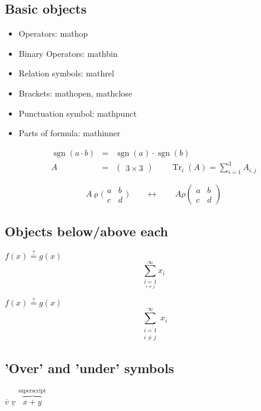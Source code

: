 \documentclass[a4paper]{article}
\begin{document}
    \subsection{Basic objects}
    \begin{itemize}
        \item Operators: mathop
        \item Binary Operators: mathbin
        \item Relation symbols: mathrel
        \item Brackets: mathopen, mathclose
        \item Punctuation symbol: mathpunct
        \item Parts of formula: mathinner
    \end{itemize}

    \newcommand{\sgn}{\mathop{\mathrm{sgn}}\nolimits}
    \newcommand{\trace}{\mathop{\mathrm{Tr}}}

    \begin{eqnarray}
        \sgn(a\cdot b) &=& \sgn(a)\cdot \sgn(b)\\
        A&=&\begin{pmatrix}
            3\times 3
        \end{pmatrix}\qquad\trace_i(A)=\sum_{i=1}^3 A_{i,j}
    \end{eqnarray}

    \newcommand{\RO}{\mathrel{\rho}}
    \newcommand{\bigleft}{\mathopen{\Big(}}
    \newcommand{\bigright}{\mathopen{\Big)}}

    \[
    A\RO \bigleft\begin{matrix}
        a&b\\
        c&d
    \end{matrix}\bigright
    \qquad \leftrightarrow \qquad
    A\rho (\begin{matrix}
        a&b\\
        c&d
    \end{matrix})
    \]

    \subsection{Objects below/above each}
    $f(x)\stackrel{?}{=}g(x)$
    $$\sum_{\underset{i\neq j}{i=1}}^{\infty}x_i$$

    $f(x)\stackrel{?}{=}g(x)$
    $$\sum_{\substack{i=1\\i\neq j}}^{\infty}x_i$$

    \subsection{'Over' and 'under' symbols}
    $\overline{v}$
    $\underline{v}$
    $\overbrace{x+y}^{\text{superscript}}$

    \pagebreak
    
\end{document}
